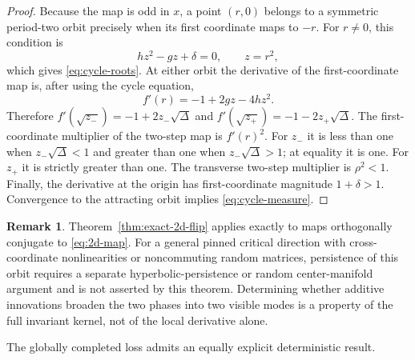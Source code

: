 \documentclass[11pt]{article}
\theoremstyle{definition}
\newtheorem{remark}{Remark}
\begin{document}
\begin{proof}
Because the map is odd in $x$, a point $(r,0)$ belongs to a symmetric
period-two orbit precisely when its first coordinate maps to $-r$.  For
$r\neq0$, this condition is
\[
  hz^2-gz+\delta=0,
  \qquad z=r^2,
\]
which gives \eqref{eq:cycle-roots}.  At either orbit the derivative of the
first-coordinate map is, after using the cycle equation,
\[
  f'(r)=-1+2gz-4hz^2.
\]
Therefore
$f'(\sqrt{z_-})=-1+2z_-\sqrt\Delta$ and
$f'(\sqrt{z_+})=-1-2z_+\sqrt\Delta$.
The first-coordinate multiplier of the two-step map is $f'(r)^2$.  For
$z_-$ it is less than one when $z_-\sqrt\Delta<1$ and greater than one when
$z_-\sqrt\Delta>1$; at equality it is one.  For $z_+$ it is strictly greater
than one.  The transverse two-step multiplier is $\rho^2<1$.
Finally, the derivative at the origin has first-coordinate magnitude
$1+\delta>1$.  Convergence to the attracting orbit implies
\eqref{eq:cycle-measure}.
\end{proof}

\begin{remark}
Theorem~\ref{thm:exact-2d-flip} applies exactly to maps orthogonally conjugate
to \eqref{eq:2d-map}.  For a general pinned critical direction with
cross-coordinate nonlinearities or noncommuting random matrices, persistence
of this orbit requires a separate hyperbolic-persistence or random
center-manifold argument and is not asserted by this theorem.  Determining
whether additive innovations broaden the two phases into two visible modes
is a property of the full invariant kernel, not of the local derivative
alone.
\end{remark}

The globally completed loss admits an equally explicit deterministic result.
\end{document}
